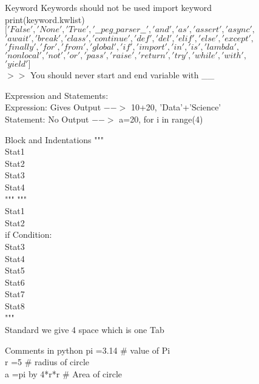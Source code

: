\documentclass[aspectratio=169, 10pt]{beamer}
\begin{document}
\begin{frame}[t]{Keyword}
 Keywords should not be used
import keyword \\
print(keyword.kwlist) \\ 
$['False', 'None', 'True', '\_ \_peg\_parser\_\_', 'and', 'as', 'assert', 'async',$\\ $'await','break', 'class', 'continue', 'def', 'del', 'elif', 'else', 'except',$\\
$'finally', 'for', 'from', 'global', 'if', 'import', 'in', 'is', 'lambda',$\\
$'nonlocal', 'not', 'or', 'pass', 'raise', 'return', 'try', 'while', 'with',$\\
$'yield']$\\
$>>$ You should never start and end variable with \_\_ 
\vspace{0.5 cm}

Expression and Statements:\\
Expression: Gives Output $-->$ 10+20, 'Data'+'Science'\\
Statement: No Output $-->$ a=20, for i in range(4)\\

\end{frame}

\begin{frame}[t]{Block and Indentations}
"""\\
Stat1\\
Stat2\\
Stat3\\
Stat4\\
"""
"""\\
Stat1\\
Stat2\\
if Condition:\\
\hspace{1cm}Stat3\\
\hspace{1cm}Stat4\\
Stat5\\
Stat6\\
Stat7\\
Stat8\\
"""\\
Standard we give 4 space which is one Tab
\end{frame}

\begin{frame}[t]{Comments in python}
pi =3.14 \hspace{1cm} \# value of Pi \\
r  =5 \hspace{1cm} \# radius of circle\\
a  =pi by 4*r*r\hspace{1cm}     \# Area of circle\\
\end{frame}
\end{document}
